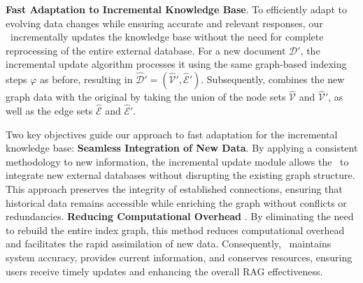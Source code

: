 
\textbf{Fast Adaptation to Incremental Knowledge Base}. To efficiently adapt to evolving data changes while ensuring accurate and relevant responses, our \model\ incrementally updates the knowledge base without the need for complete reprocessing of the entire external database. For a new document $\mathcal{D}'$, the incremental update algorithm processes it using the same graph-based indexing steps $\varphi$ as before, resulting in $\hat{\mathcal{D}}' = (\hat{\mathcal{V}}', \hat{\mathcal{E}}')$. Subsequently, \model combines the new graph data with the original by taking the union of the node sets $\hat{\mathcal{V}}$ and $\hat{\mathcal{V}}'$, as well as the edge sets $\hat{\mathcal{E}}$ and $\hat{\mathcal{E}}'$.

Two key objectives guide our approach to fast adaptation for the incremental knowledge base: \textbf{Seamless Integration of New Data}. By applying a consistent methodology to new information, the incremental update module allows the \model\ to integrate new external databases without disrupting the existing graph structure. This approach preserves the integrity of established connections, ensuring that historical data remains accessible while enriching the graph without conflicts or redundancies. \textbf{Reducing Computational Overhead
}. By eliminating the need to rebuild the entire index graph, this method reduces computational overhead and facilitates the rapid assimilation of new data. Consequently, \model\ maintains system accuracy, provides current information, and conserves resources, ensuring users receive timely updates and enhancing the overall RAG effectiveness.

